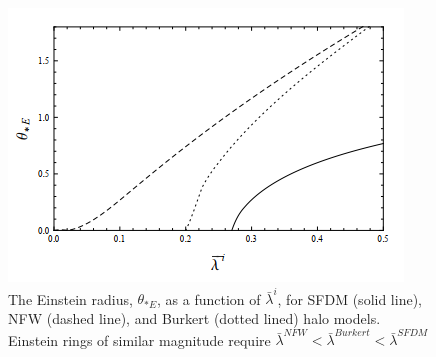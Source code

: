 \documentclass[9.5pt, twocolumn]{article}
\begin{document}
\begin{figure}
    \includegraphics[scale=0.8]{grafica2.png}
    \caption{The Einstein radius, $\theta_{*E}$, as a function of $\bar{\lambda}^i$, for SFDM (solid line), NFW (dashed line), and Burkert (dotted lined) halo models. Einstein rings of similar magnitude require $\bar{\lambda}^{NFW}<\bar{\lambda}^{Burkert}<\bar{\lambda}^{SFDM}$}
    \label{fig:Grafica2}
\end{figure}
\end{document}
